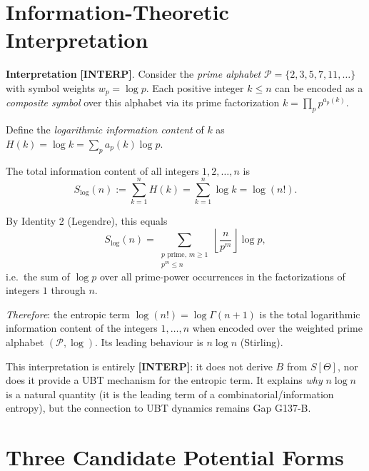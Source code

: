 \documentclass[12pt,a4paper]{article}
\theoremstyle{definition}
\theoremstyle{remark}
\newcommand{\INTERP}{\textcolor{blue!60!black}{\textbf{[INTERP]}}}
\begin{document}
\section{Information-Theoretic Interpretation}
\label{sec:info_theory}

\begin{infobox}
\textbf{Interpretation} \INTERP{}.  Consider the \emph{prime alphabet}
$\mathcal{P} = \{2, 3, 5, 7, 11, \ldots\}$ with symbol weights $w_p = \log p$.
Each positive integer $k \leq n$ can be encoded as a \emph{composite symbol}
over this alphabet via its prime factorization $k = \prod_p p^{a_p(k)}$.

Define the \emph{logarithmic information content} of $k$ as
$H(k) = \log k = \sum_p a_p(k)\log p$.

The total information content of all integers $1, 2, \ldots, n$ is
\begin{equation}
  S_{\log}(n)
  := \sum_{k=1}^{n} H(k)
   = \sum_{k=1}^{n} \log k
   = \log(n!).
\end{equation}

By Identity 2 (Legendre), this equals
\begin{equation}
  S_{\log}(n) = \sum_{\substack{p \text{ prime},\, m \geq 1 \\ p^m \leq n}}
                \left\lfloor \frac{n}{p^m} \right\rfloor \log p,
  \label{eq:Slog_legendre}
\end{equation}
i.e.\ the sum of $\log p$ over all prime-power occurrences in the factorizations
of integers $1$ through $n$.

\emph{Therefore}: the entropic term $\log(n!) = \log\Gamma(n+1)$ is the total
logarithmic information content of the integers $1, \ldots, n$ when encoded
over the weighted prime alphabet $(\mathcal{P},\log)$.  Its leading behaviour
is $n\log n$ (Stirling).
\end{infobox}

This interpretation is entirely \INTERP{}: it does not derive $B$ from $S[\Theta]$,
nor does it provide a UBT mechanism for the entropic term.  It explains \emph{why}
$n\log n$ is a natural quantity (it is the leading term of a combinatorial/information
entropy), but the connection to UBT dynamics remains Gap G137-B.

\section{Three Candidate Potential Forms}
\label{sec:candidates}
\end{document}
